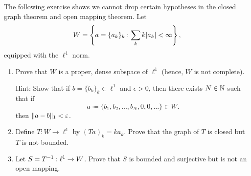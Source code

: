 \documentclass[a4paper, 10pt]{article}
\begin{document}
\begin{problem} 
    The following exercise shows we cannot drop certain hypotheses in the closed graph theorem and open mapping theorem. Let \begin{equation*}
    W = \left\{a = \{a_k\}_k : \sum_{k} k \lvert a_k\rvert < \infty\right\},
    \end{equation*}
    equipped with the $\ell^1$ norm.
    \begin{enumerate}
    \item Prove that $W$ is a proper, dense subspace of $\ell^1$ (hence, $W$ is not complete).

    Hint: Show that if $b = \{b_k\}_{k} \in \ell^1$ and $\epsilon > 0$, then there exists $N \in \mathbb{N}$ such that if \begin{equation*}
    a\coloneqq \{b_1, b_2, \ldots, b_N, 0, 0, \ldots\}   \in W.
    \end{equation*}
    then $\lVert a - b\rVert_1 < \varepsilon$.
    \item Define $T: W \to \ell^1$ by $(Ta)_k = ka_k$. Prove that the graph of $T$ is closed but $T$ is not bounded.
    \item Let $S = {T}^{-1} : \ell^1 \to W$. Prove that $S$ is bounded and surjective but is not an open mapping.
    \end{enumerate}
\end{problem}
\end{document}
